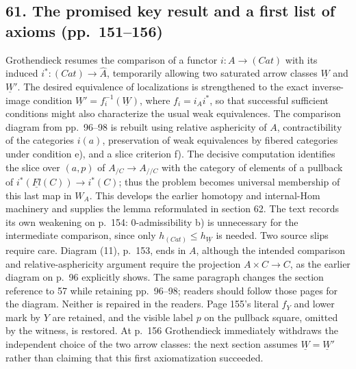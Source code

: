 \documentclass[10pt,oneside]{book}
\begin{document}
\subsection*{61. The promised key result and a first list of axioms (pp.~151--156)}
Grothendieck resumes the comparison of a functor $i:A\to(Cat)$ with its induced $i^*:(Cat)\to\widehat A$, temporarily allowing two saturated arrow classes $\underline W$ and $\underline W'$. The desired equivalence of localizations is strengthened to the exact inverse-image condition $\underline W'=f_i^{-1}(\underline W)$, where $f_i=i_Ai^*$, so that successful sufficient conditions might also characterize the usual weak equivalences. The comparison diagram from pp.~96--98 is rebuilt using relative asphericity of $A$, contractibility of the categories $i(a)$, preservation of weak equivalences by fibered categories under condition e), and a slice criterion f). The decisive computation identifies the slice over $(a,p)$ of $A_{/C}\to A_{//C}$ with the category of elements of a pullback of $i^*(\underline{Fl}(C))\to i^*(C)$; thus the problem becomes universal membership of this last map in $W_A$. This develops the earlier homotopy and internal-Hom machinery and supplies the lemma reformulated in section 62. The text records its own weakening on p.~154: 0-admissibility b) is unnecessary for the intermediate comparison, since only $h_{(Cat)}\leq h_{\underline W}$ is needed. Two source slips require care. Diagram (11), p.~153, ends in $A$, although the intended comparison and relative-asphericity argument require the projection $A\times C\to C$, as the earlier diagram on p.~96 explicitly shows. The same paragraph changes the section reference to 57 while retaining pp.~96--98; readers should follow those pages for the diagram. Neither is repaired in the readers. Page 155's literal $f_Y$ and lower mark by $Y$ are retained, and the visible label $p$ on the pullback square, omitted by the witness, is restored. At p.~156 Grothendieck immediately withdraws the independent choice of the two arrow classes: the next section assumes $\underline W=\underline W'$ rather than claiming that this first axiomatization succeeded.
\end{document}

